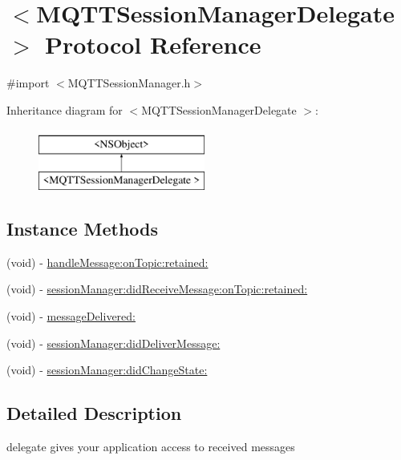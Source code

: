 \hypertarget{protocol_m_q_t_t_session_manager_delegate_01-p}{}\section{$<$M\+Q\+T\+T\+Session\+Manager\+Delegate $>$ Protocol Reference}
\label{protocol_m_q_t_t_session_manager_delegate_01-p}


{\ttfamily \#import $<$M\+Q\+T\+T\+Session\+Manager.\+h$>$}

Inheritance diagram for $<$M\+Q\+T\+T\+Session\+Manager\+Delegate $>$\+:\begin{figure}[H]
\begin{center}
\leavevmode
\includegraphics[height=2.000000cm]{protocol_m_q_t_t_session_manager_delegate_01-p}
\end{center}
\end{figure}
\subsection*{Instance Methods}
\begin{DoxyCompactItemize}
\item 
(void) -\/ \hyperlink{protocol_m_q_t_t_session_manager_delegate_01-p_a227652079bb618b7b72daeb2bc4ff2ec}{handle\+Message\+:on\+Topic\+:retained\+:}
\item 
(void) -\/ \hyperlink{protocol_m_q_t_t_session_manager_delegate_01-p_aeb6f07319f8362c30f914cf02e1843c8}{session\+Manager\+:did\+Receive\+Message\+:on\+Topic\+:retained\+:}
\item 
(void) -\/ \hyperlink{protocol_m_q_t_t_session_manager_delegate_01-p_ac5c24515442786b7f4ee2b29a103fac4}{message\+Delivered\+:}
\item 
(void) -\/ \hyperlink{protocol_m_q_t_t_session_manager_delegate_01-p_ac76a8d6565abe56028b22a77f75d0af5}{session\+Manager\+:did\+Deliver\+Message\+:}
\item 
(void) -\/ \hyperlink{protocol_m_q_t_t_session_manager_delegate_01-p_a6569e1ca87d4e098645e715ac69dcc53}{session\+Manager\+:did\+Change\+State\+:}
\end{DoxyCompactItemize}


\subsection{Detailed Description}
delegate gives your application access to received messages 

